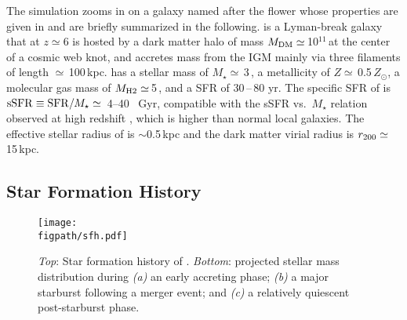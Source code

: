 \IfFileExists{emulateapjlegacy.cls}{\documentclass[iop]{emulateapjlegacy}}{\documentclass[iop]{emulateapj}}
\def\figpath{./Fig}
\begin{document}
The simulation zooms in on a galaxy named after the flower \flower whose properties are given in \citet{Pallottini17a} and are briefly summarized in the following. \flower is a Lyman-break galaxy that at $z\simeq 6$ is hosted by a dark matter halo of mass $M_{\rm DM}\simeq$\,10$^{11}$\,\Msun at the center of a cosmic web knot, and accretes mass from the IGM mainly via three filaments of length $\simeq$\,100\,kpc. \flower has a stellar mass of $M_\star\simeq$\,3\,\Msun, a metallicity of $Z\simeq$\,0.5\,$Z_{\odot}$, a molecular gas mass of $M_{\rm H2}\simeq$\,5\,\Msun, and a SFR of 30\,--\,80\,\Msun\,yr\pmOne. 
%
The specific SFR of \flower is ${\rm sSFR} \equiv {\rm SFR}/M_{\star} \simeq$~4--40 ~Gyr\pmOne, compatible with the sSFR vs.\ $M_{\star}$ relation observed at high redshift \citep{Jiang2016}, which is higher than normal local galaxies. The effective stellar radius of \flower is $\sim$0.5\,kpc and the dark matter virial radius is $r_{\rm 200}\simeq$\,15\,kpc. 

\subsection{Star Formation History} \label{sec:sfh}

\begin{figure*}
\centering
\texttt{[image: \\figpath/sfh.pdf]}
\caption{
    {\it Top}: Star formation history of \flower. {\it Bottom}:
    projected stellar mass distribution during {\it (a)} an early
    accreting phase;  {\it (b)} a major starburst following a merger
    event; and {\it (c)} a relatively quiescent post-starburst
    phase. 
\label{fig:SFH}}
\end{figure*}
\end{document}
